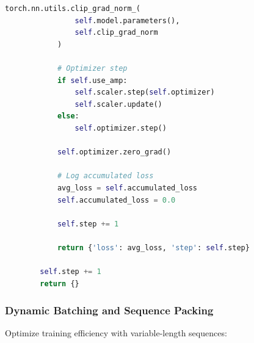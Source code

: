 \documentclass[11pt]{article}
\begin{document}
\begin{lstlisting}[language=Python, caption=Gradient Accumulation with Mixed Precision]
            torch.nn.utils.clip_grad_norm_(
                self.model.parameters(),
                self.clip_grad_norm
            )
            
            # Optimizer step
            if self.use_amp:
                self.scaler.step(self.optimizer)
                self.scaler.update()
            else:
                self.optimizer.step()
            
            self.optimizer.zero_grad()
            
            # Log accumulated loss
            avg_loss = self.accumulated_loss
            self.accumulated_loss = 0.0
            
            self.step += 1
            
            return {'loss': avg_loss, 'step': self.step}
        
        self.step += 1
        return {}
\end{lstlisting}

\subsubsection{Dynamic Batching and Sequence Packing}

Optimize training efficiency with variable-length sequences:
\end{document}
